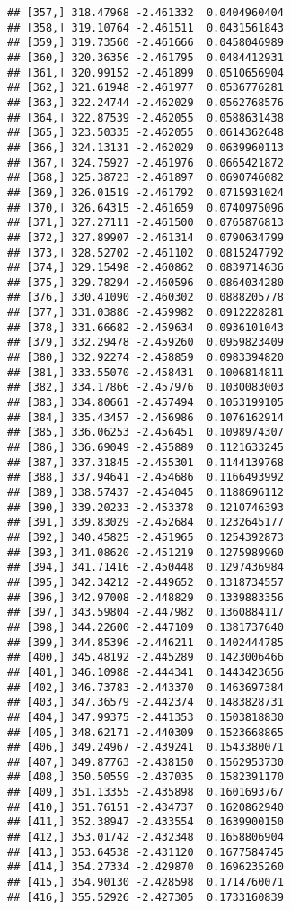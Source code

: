 \documentclass[]{book}
\theoremstyle{definition}
\theoremstyle{definition}
\theoremstyle{definition}
\theoremstyle{remark}
\begin{document}
\begin{verbatim}
## [357,] 318.47968 -2.461332  0.0404960404
## [358,] 319.10764 -2.461511  0.0431561843
## [359,] 319.73560 -2.461666  0.0458046989
## [360,] 320.36356 -2.461795  0.0484412931
## [361,] 320.99152 -2.461899  0.0510656904
## [362,] 321.61948 -2.461977  0.0536776281
## [363,] 322.24744 -2.462029  0.0562768576
## [364,] 322.87539 -2.462055  0.0588631438
## [365,] 323.50335 -2.462055  0.0614362648
## [366,] 324.13131 -2.462029  0.0639960113
## [367,] 324.75927 -2.461976  0.0665421872
## [368,] 325.38723 -2.461897  0.0690746082
## [369,] 326.01519 -2.461792  0.0715931024
## [370,] 326.64315 -2.461659  0.0740975096
## [371,] 327.27111 -2.461500  0.0765876813
## [372,] 327.89907 -2.461314  0.0790634799
## [373,] 328.52702 -2.461102  0.0815247792
## [374,] 329.15498 -2.460862  0.0839714636
## [375,] 329.78294 -2.460596  0.0864034280
## [376,] 330.41090 -2.460302  0.0888205778
## [377,] 331.03886 -2.459982  0.0912228281
## [378,] 331.66682 -2.459634  0.0936101043
## [379,] 332.29478 -2.459260  0.0959823409
## [380,] 332.92274 -2.458859  0.0983394820
## [381,] 333.55070 -2.458431  0.1006814811
## [382,] 334.17866 -2.457976  0.1030083003
## [383,] 334.80661 -2.457494  0.1053199105
## [384,] 335.43457 -2.456986  0.1076162914
## [385,] 336.06253 -2.456451  0.1098974307
## [386,] 336.69049 -2.455889  0.1121633245
## [387,] 337.31845 -2.455301  0.1144139768
## [388,] 337.94641 -2.454686  0.1166493992
## [389,] 338.57437 -2.454045  0.1188696112
## [390,] 339.20233 -2.453378  0.1210746393
## [391,] 339.83029 -2.452684  0.1232645177
## [392,] 340.45825 -2.451965  0.1254392873
## [393,] 341.08620 -2.451219  0.1275989960
## [394,] 341.71416 -2.450448  0.1297436984
## [395,] 342.34212 -2.449652  0.1318734557
## [396,] 342.97008 -2.448829  0.1339883356
## [397,] 343.59804 -2.447982  0.1360884117
## [398,] 344.22600 -2.447109  0.1381737640
## [399,] 344.85396 -2.446211  0.1402444785
## [400,] 345.48192 -2.445289  0.1423006466
## [401,] 346.10988 -2.444341  0.1443423656
## [402,] 346.73783 -2.443370  0.1463697384
## [403,] 347.36579 -2.442374  0.1483828731
## [404,] 347.99375 -2.441353  0.1503818830
## [405,] 348.62171 -2.440309  0.1523668865
## [406,] 349.24967 -2.439241  0.1543380071
## [407,] 349.87763 -2.438150  0.1562953730
## [408,] 350.50559 -2.437035  0.1582391170
## [409,] 351.13355 -2.435898  0.1601693767
## [410,] 351.76151 -2.434737  0.1620862940
## [411,] 352.38947 -2.433554  0.1639900150
## [412,] 353.01742 -2.432348  0.1658806904
## [413,] 353.64538 -2.431120  0.1677584745
## [414,] 354.27334 -2.429870  0.1696235260
## [415,] 354.90130 -2.428598  0.1714760071
## [416,] 355.52926 -2.427305  0.1733160839

\end{verbatim}
\end{document}
